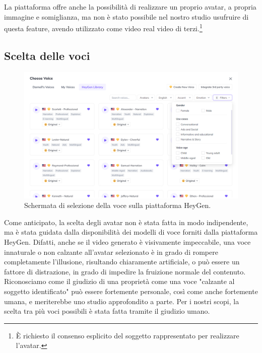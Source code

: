 La piattaforma offre anche la possibilità di realizzare un proprio avatar, a propria immagine e somiglianza, ma non è stato possibile nel nostro studio usufruire di questa feature, avendo utilizzato come video real video di terzi.\footnote{È richiesto il consenso esplicito del soggetto rappresentato per realizzare l'avatar.} 


\subsection{Scelta delle voci}

\begin{figure}[t]
    \centering
    \includegraphics[width=0.9\linewidth]{images/voice_selection}
    \caption{Schermata di selezione della voce sulla piattaforma HeyGen.}
    \label{fig:voice_selection}
\end{figure}

Come anticipato, la scelta degli avatar non è stata fatta in modo indipendente, ma è stata guidata dalla disponibilità dei modelli di voce forniti dalla piattaforma HeyGen. Difatti, anche se il video generato è visivamente impeccabile, una voce innaturale o non calzante all'avatar selezionato è in grado di rompere completamente l'illusione, risultando chiaramente artificiale, o può essere un fattore di distrazione, in grado di impedire la fruizione normale del contenuto. Riconosciamo come il giudizio di una proprietà come una voce "calzante al soggetto identificato" può essere fortemente personale, così come anche fortemente umana, e meriterebbe uno studio approfondito a parte. Per i nostri scopi, la scelta tra più voci possibili è stata fatta tramite il giudizio umano. 

